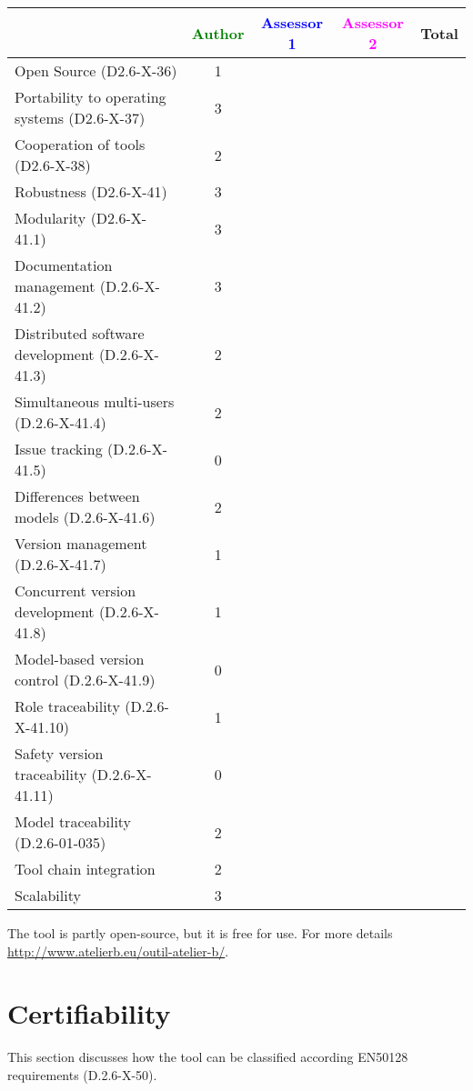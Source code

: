 \begin{tabular}{|l | c | c | c | c|}
\hline
& \textcolor{green}{Author} & \textcolor{blue}{Assessor 1} & \textcolor{magenta}{Assessor 2} & Total \\
\hline 
Open Source (D2.6-X-36) & 1 & & &  \\
\hline 
Portability to operating systems (D2.6-X-37) & 3 & & &  \\
\hline
Cooperation of tools (D2.6-X-38) & 2 & & &  \\
\hline
Robustness (D2.6-X-41) & 3 & & & \\
\hline
Modularity (D2.6-X-41.1) & 3 & & & \\
\hline
Documentation management (D.2.6-X-41.2) & 3 & & & \\
\hline
Distributed software development (D.2.6-X-41.3)  & 2 & & & \\
\hline
Simultaneous multi-users (D.2.6-X-41.4)   & 2 & & & \\
\hline
Issue tracking (D.2.6-X-41.5) & 0 & & & \\
\hline
Differences between models (D.2.6-X-41.6) & 2 & & & \\
\hline
Version management (D.2.6-X-41.7) & 1 & & & \\
\hline
Concurrent version development (D.2.6-X-41.8) & 1 & & & \\
\hline
Model-based version control (D.2.6-X-41.9) & 0 & & & \\
\hline
Role traceability (D.2.6-X-41.10) & 1 & & & \\
\hline
Safety version traceability (D.2.6-X-41.11) & 0 & & & \\
\hline
Model traceability (D.2.6-01-035) & 2 & & & \\
\hline
Tool chain integration & 2 & & & \\
\hline
Scalability & 3 & & & \\
\hline
\end{tabular}

\begin{author_comment}
The tool is partly open-source, but it is free for use.
For more details \url{http://www.atelierb.eu/outil-atelier-b/}.
\end{author_comment}


\section{Certifiability}

This section discusses how the tool can be classified according EN50128 requirements (D.2.6-X-50).


